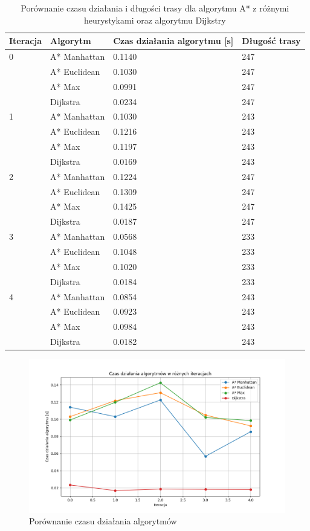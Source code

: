 \documentclass[12pt,twoside]{article}
\begin{document}
\begin{table}[h]
\centering
\begin{tabular}{|p{}|p{}|p{}|p{}|}    
\hline
\textbf{Iteracja} & \textbf{Algorytm} & \textbf{Czas działania algorytmu [s]} & \textbf{Długość trasy} \\
\hline
0 & 
A* Manhattan & 
0.1140 & 
247 \\
 & 
A* Euclidean & 
0.1030 & 
247 \\
 & 
A* Max & 
0.0991 & 
247 \\
 & 
Dijkstra & 
0.0234 & 
247 \\
\hline
1 & 
A* Manhattan & 
0.1030 & 
243 \\
 & 
A* Euclidean & 
0.1216 & 
243 \\
 & 
A* Max & 
0.1197 & 
243 \\
 & 
Dijkstra & 
0.0169 & 
243 \\
\hline
2 & 
A* Manhattan & 
0.1224 & 
247 \\
 & 
A* Euclidean & 
0.1309 & 
247 \\
 & 
A* Max & 
0.1425 & 
247 \\
 & 
Dijkstra & 
0.0187 & 
247 \\
\hline
3 & 
A* Manhattan & 
0.0568 & 
233 \\
 & 
A* Euclidean & 
0.1048 & 
233 \\
 & 
A* Max & 
0.1020 & 
233 \\
 & 
Dijkstra & 
0.0184 & 
233 \\
\hline
4 & 
A* Manhattan & 
0.0854 & 
243 \\
 & 
A* Euclidean & 
0.0923 & 
243 \\
 & 
A* Max & 
0.0984 & 
243 \\
 & 
Dijkstra & 
0.0182 & 
243 \\
\hline
\end{tabular}
\caption{Porównanie czasu działania i długości trasy dla algorytmu A* z różnymi heurystykami oraz algorytmu Dijkstry}
\label{Tab:Astar_Dijkstra_results}
\end{table}

\begin{figure}[ht]%
 \centering%
 \includegraphics[width=12cm]{figures/static_algo/charts/walls/algorithm_times_walls.png}%
 \caption{Porównanie czasu działania algorytmów}%
 \label{Fig:astar_vs_dijkstra_walls}%
\end{figure}
\end{document}
